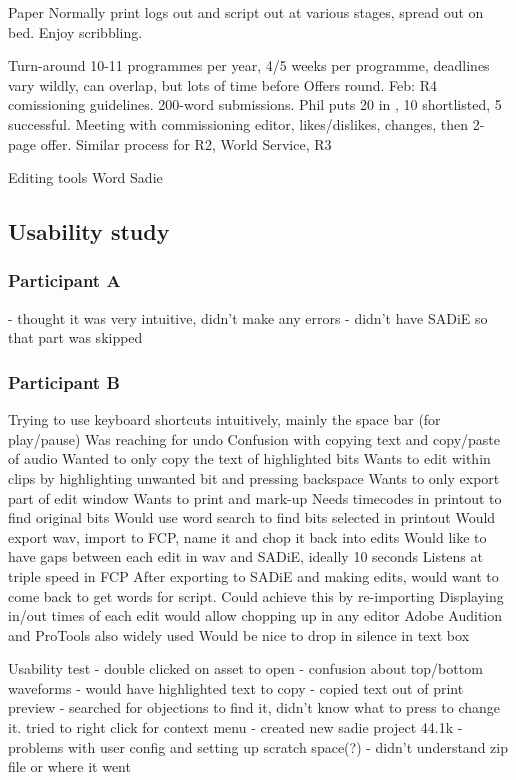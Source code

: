 Paper
Normally print logs out and script out at various stages, spread out on bed.
Enjoy scribbling.

Turn-around
10-11 programmes per year, 4/5 weeks per programme, deadlines vary wildly, can
overlap, but lots of time before
Offers round. Feb: R4 comissioning guidelines. 200-word submissions. Phil puts
20 in , 10 shortlisted, 5 successful.
Meeting with commissioning editor, likes/dislikes, changes, then 2-page offer.
Similar process for R2, World Service, R3

Editing tools
Word
Sadie

\subsection{Usability study}

\subsubsection{Participant A}
- thought it was very intuitive, didn't make any errors
- didn't have SADiE so that part was skipped

\subsubsection{Participant B}

Trying to use keyboard shortcuts intuitively, mainly the space bar (for
play/pause)
Was reaching for undo
Confusion with copying text and copy/paste of audio
Wanted to only copy the text of highlighted bits
Wants to edit within clips by highlighting unwanted bit and pressing backspace
Wants to only export part of edit window
Wants to print and mark-up
Needs timecodes in printout to find original bits
Would use word search to find bits selected in printout
Would export wav, import to FCP, name it and chop it back into edits
Would like to have gaps between each edit in wav and SADiE, ideally 10 seconds
Listens at triple speed in FCP
After exporting to SADiE and making edits, would want to come back to get words
for script. Could achieve this by re-importing
Displaying in/out times of each edit would allow chopping up in any editor
Adobe Audition and ProTools also widely used
Would be nice to drop in silence in text box

Usability test
- double clicked on asset to open
- confusion about top/bottom waveforms
- would have highlighted text to copy
- copied text out of print preview
- searched for objections to find it, didn't know what to press to change it.
tried to right click for context menu
- created new sadie project 44.1k
- problems with user config and setting up scratch space(?)
- didn't understand zip file or where it went

